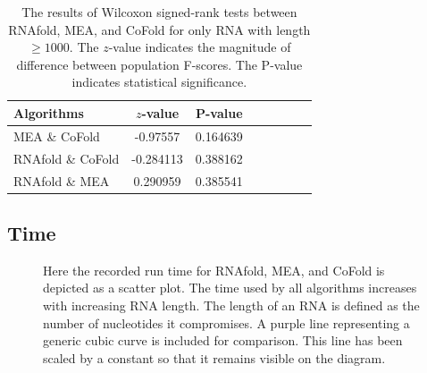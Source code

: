 \documentclass[12pt, a4paper]{article}
\begin{document}
\begin{table}
\centering
\begin{tabular}{l*{6}{c}r}
Algorithms	& $z$-value & P-value \\
\hline 
MEA \& CoFold &  -0.97557    &    0.164639   \\
RNAfold \& CoFold &  -0.284113    &    0.388162  \\
RNAfold \& MEA &  0.290959   &    0.385541  \\
\end{tabular}
\caption{The results of Wilcoxon signed-rank tests between RNAfold, MEA, and CoFold for only RNA with length $\geq 1000$. The $z$-value indicates the magnitude of difference between population F-scores. The P-value indicates statistical significance.}
\label{tab:wilcoxon_large}
\end{table}


\subsection{Time}

\begin{figure}
\begin{center}
\end{center}
\caption{Here the recorded run time for RNAfold, MEA, and CoFold is depicted as a scatter plot. The time used by all algorithms increases with increasing RNA length. The length of an RNA is defined as the number of nucleotides it compromises. A purple line representing a generic cubic curve is included for comparison. This line has been scaled by a constant so that it remains visible on the diagram.}
\label{fig:timegraph}
\end{figure}
\end{document}
